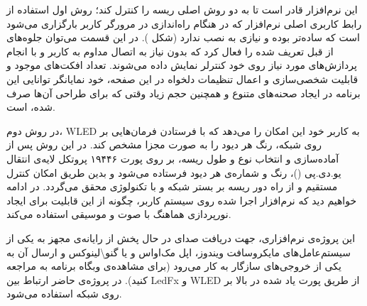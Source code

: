 این نرم‌افزار قادر است تا به دو روش اصلی ریسه را کنترل کند؛ روش اول استفاده از رابط کاربری اصلی نرم‌افزار که در هنگام راه‌اندازی در مرورگر کاربر بارگزاری می‌شود است که ساده‌تر بوده و نیازی به نصب ندارد (شکل ). در این قسمت می‌توان جلوه‌های از قبل تعریف شده را فعال کرد که بدون نیاز به اتصال مداوم به کاربر و با انجام پردازش‌های مورد نیاز روی خود کنترلر نمایش داده می‌شوند. تعداد افکت‌های موجود و قابلیت شخصی‌سازی و اعمال تنظیمات دلخواه در این صفحه، خود نمایانگر توانایی این برنامه در ایجاد صحنه‌های متنوع و همچنین حجم زیاد وقتی که برای طراحی آن‌ها صرف شده، است.

در روش دوم، WLED به کاربر خود این امکان را می‌دهد که با فرستادن فرمان‌هایی بر روی شبکه، رنگ هر دیود را به صورت مجزا مشخص کند. در این روش پس از آماده‌سازی و انتخاب نوع و طول ریسه، بر روی پورت ۱۹۴۴۶ پروتکل لایه‌ی انتقال یو.دی.پی ()، رنگ و شماره‌ی هر دیود فرستاده می‌شود و بدین طریق امکان کنترل مستقیم و از راه دور ریسه بر بستر شبکه و با تکنولوژی  محقق می‌گردد. در ادامه خواهیم دید که نرم‌افزار اجرا شده روی سیستم کاربر، چگونه از این قابلیت برای ایجاد نورپردازی هماهنگ با صوت و موسیقی استفاده می‌کند.


این پروژه‌ی نرم‌افزاری، جهت دریافت صدای در حال پخش از رایانه‌ی مجهز به یکی از سیستم‌عامل‌های مایکروسافت ویندوز، اپل مک‌اواس و یا گنو\textbackslash{لینوکس} و ارسال آن به یکی از خروجی‌های سازگار به کار می‌رود (برای مشاهده‌ی وبگاه برنامه به  مراجعه کنید). در پروژه‌ی حاضر ارتباط بین LedFx و WLED از طریق پورت یاد شده در بالا بر روی شبکه استفاده می‌شود.


